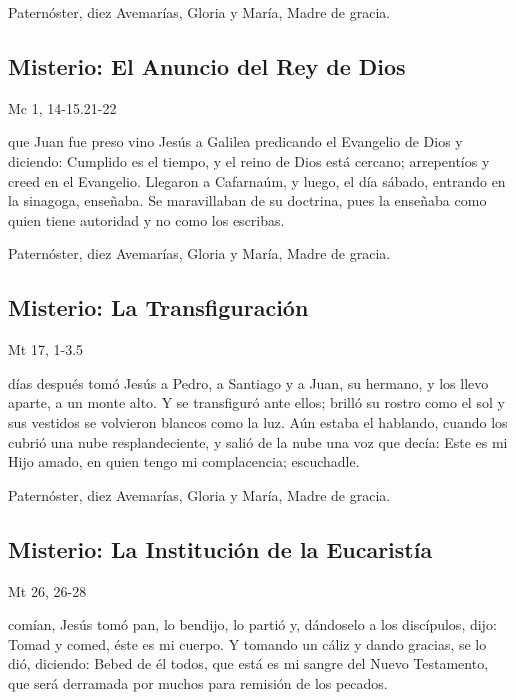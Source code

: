 \documentclass[10pt,a4paper,oneside]{book}
\newcounter{lux-counter}
\begin{document}
\begin{center}
      Paternóster, diez Avemarías, Gloria y María, Madre de gracia.
\end{center}

\subsection*{ Misterio: El Anuncio del Rey de Dios}
\begin{flushright}
      {\color{red}Mc 1, 14-15.21-22}
\end{flushright}
 que Juan fue preso vino Jesús a Galilea predicando el Evangelio de Dios y diciendo: Cumplido es el tiempo, y el reino de Dios está cercano;
arrepentíos y creed en el Evangelio. Llegaron a Cafarnaúm, y luego, el día sábado, entrando en la sinagoga, enseñaba. Se maravillaban de su doctrina,
pues la enseñaba como quien tiene autoridad y no como los escribas.

\begin{center}
      Paternóster, diez Avemarías, Gloria y María, Madre de gracia.
\end{center}

\subsection*{ Misterio: La Transfiguración}
\begin{flushright}
      {\color{red}Mt 17, 1-3.5}
\end{flushright}
 días después tomó Jesús a Pedro, a Santiago y a Juan, su hermano, y los llevo aparte, a un monte alto. Y se transfiguró ante ellos;
brilló su rostro como el sol y sus vestidos se volvieron blancos como la luz. Aún estaba el hablando, cuando los cubrió una nube resplandeciente,
y salió de la nube una voz que decía: Este es mi Hijo amado, en quien tengo mi complacencia; escuchadle.

\begin{center}
      Paternóster, diez Avemarías, Gloria y María, Madre de gracia.
\end{center}

\subsection*{ Misterio: La Institución de la Eucaristía}
\begin{flushright}
      {\color{red}Mt 26, 26-28}
\end{flushright}
 comían, Jesús tomó pan, lo bendijo, lo partió y, dándoselo a los discípulos, dijo: Tomad y comed, éste es mi cuerpo. Y tomando un cáliz y dando gracias,
se lo dió, diciendo: Bebed de él todos, que está es mi sangre del Nuevo Testamento, que será derramada por muchos para remisión de los pecados.
\end{document}
